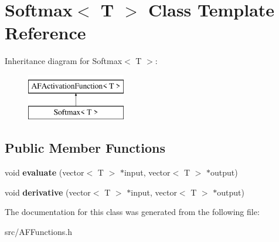 \hypertarget{classSoftmax}{}\section{Softmax$<$ T $>$ Class Template Reference}
\label{classSoftmax}
Inheritance diagram for Softmax$<$ T $>$\+:\begin{figure}[H]
\begin{center}
\leavevmode
\includegraphics[height=2.000000cm]{classSoftmax}
\end{center}
\end{figure}
\subsection*{Public Member Functions}
\begin{DoxyCompactItemize}
\item 
\mbox{\label{classSoftmax_a79fec04daf2c3fa8d234b0e1a0412b1e}} 
void {\bfseries evaluate} (vector$<$ T $>$ $\ast$input, vector$<$ T $>$ $\ast$output)
\item 
\mbox{\label{classSoftmax_a2d61ce9b663c70c79bbac6e4b47d0c6d}} 
void {\bfseries derivative} (vector$<$ T $>$ $\ast$input, vector$<$ T $>$ $\ast$output)
\end{DoxyCompactItemize}


The documentation for this class was generated from the following file\+:\begin{DoxyCompactItemize}
\item 
src/A\+F\+Functions.\+h\end{DoxyCompactItemize}
